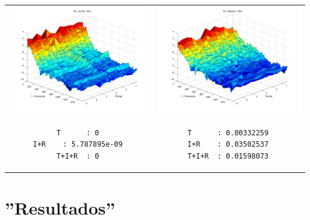 \documentclass[12pt,a4paper]{mitthesis}
\begin{document}
\begin{tabular}{cc}
\includegraphics[width=0.5\linewidth]{n8f.pdf} 
&
\includegraphics[width=0.5\linewidth]{d8f.pdf} 
\\
\begin{lstlisting}
T      : 0 
I+R    : 5.787895e-09 
T+I+R  : 0 
\end{lstlisting}
&
\begin{lstlisting}
T      : 0.00332259 
I+R    : 0.03502537 
T+I+R  : 0.01598073 
\end{lstlisting}
\end{tabular}


\chapter{''Resultados''}
\end{document}
